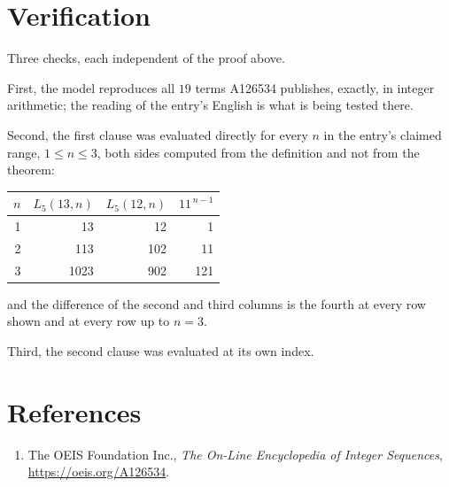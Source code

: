\documentclass[11pt,a4paper]{article}
\theoremstyle{plain}
\theoremstyle{definition}
\begin{document}
\section{Verification}

Three checks, each independent of the proof above.

First, the model reproduces all $19$ terms A126534 publishes, exactly, in integer
arithmetic; the reading of the entry's English is what is being tested there.

Second, the first clause was evaluated directly for every $n$ in the entry's claimed range,
$1\le n\le3$, both sides computed from the definition and not from the theorem:

\begin{center}
\begin{tabular}{rrrr}
$n$ & $L_{5}(13,n)$ & $L_{5}(12,n)$ & $11^{\,n-1}$ \\ \hline
1 & 13 & 12 & 1 \\
2 & 113 & 102 & 11 \\
3 & 1023 & 902 & 121 \\
\end{tabular}
\end{center}

\noindent and the difference of the second and third columns is the fourth at every row shown
and at every row up to $n=3$.

Third, the second clause was evaluated at its own index.

\section*{References}
\begin{enumerate}
\item The OEIS Foundation Inc., \emph{The On-Line Encyclopedia of Integer Sequences},
\url{https://oeis.org/A126534}.
\end{enumerate}
\end{document}
